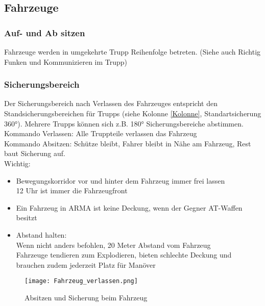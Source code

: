 \subsection{Fahrzeuge}
\subsubsection{Auf- und Ab sitzen}
	Fahrzeuge werden in umgekehrte Trupp Reihenfolge betreten. (Siehe auch \glqq Richtig Funken und Kommunizieren im Trupp\grqq)
	
\subsubsection{Sicherungsbereich}
	Der Sicherungsbereich nach Verlassen des Fahrzeuges entspricht den Standsicherungsbereichen für  Trupps (siehe Kolonne \autoref{Kolonne}, Standartsicherung 360°). Mehrere Trupps können sich z.B. 180° Sicherungsbereiche abstimmen. \\
	Kommando Verlassen:  Alle Truppteile verlassen das Fahrzeug \\
	Kommando Absitzen: Schütze bleibt, Fahrer bleibt in Nähe am Fahrzeug, Rest baut Sicherung auf.\\
	
	Wichtig:
	\begin{itemize}
		\item Bewegungskorridor vor und hinter dem Fahrzeug immer frei lassen\\ 12 Uhr ist immer die Fahrzeugfront
		\item Ein Fahrzeug in ARMA ist keine Deckung, wenn der Gegner AT-Waffen besitzt
		\item Abstand halten:\\ Wenn nicht anders befohlen, 20 Meter Abstand vom Fahrzeug\\ Fahrzeuge tendieren zum Explodieren, bieten schlechte Deckung und brauchen zudem jederzeit Platz für Manöver
	\end{itemize}
	\begin{figure}[htbp]
		\centering
		\texttt{[image: Fahrzeug\_verlassen.png]}
		\caption{Absitzen und Sicherung beim Fahrzeug}
	\end{figure}
